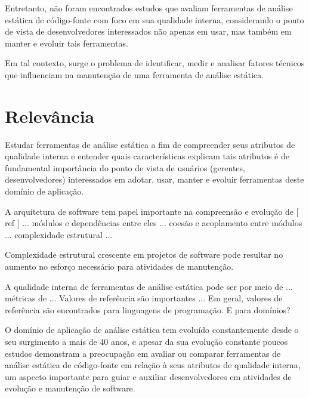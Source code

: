Entretanto, não foram encontrados estudos que avaliam 
ferramentas de análise estática de código-fonte 
com foco em sua qualidade interna, 
considerando o ponto de vista de desenvolvedores interessados 
não apenas em usar, mas também em manter e evoluir tais ferramentas.

Em tal contexto, surge o problema de identificar, medir e analisar fatores
técnicos que influenciam na manutenção de uma ferramenta de análise estática. 

\section{Relevância}

Estudar ferramentas de análise estática a fim de compreender seus atributos de
qualidade interna e entender quais características %
explicam tais atributos é de fundamental importância do 
ponto de vista de usuários (gerentes, desenvolvedores) interessados
em adotar, usar, manter e evoluir ferramentas deste domínio de aplicação.

A arquitetura de software tem papel importante na compreensão e evolução 
de [ ref ] ...
módulos e dependências entre eles ... coesão e acoplamento entre módulos ...
complexidade estrutural ...
 
Complexidade estrutural crescente em projetos de software pode resultar
no aumento no esforço necessário para atividades de manutenção.

A qualidade interna de ferramentas de análise estática pode ser 
por meio de ... métricas de ... 
Valores de referência são importantes ...
Em geral, valores de referência são encontrados para linguagens de programação.
E para domínios?


O domínio de aplicação de análise estática tem evoluído constantemente desde o
seu surgimento a mais de 40 anos, e apesar da sua evolução constante poucos
estudos demonstram a preocupação em avaliar ou comparar ferramentas de análise
estática de código-fonte em relação à seus atributos de qualidade interna, um
aspecto importante para guiar e auxiliar desenvolvedores em atividades de
evolução e manutenção de software.

